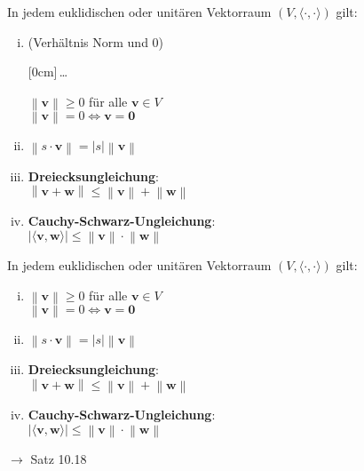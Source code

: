 \documentclass[11pt]{article}
\renewcommand{\cite}[1]{\par\bigskip\hfill{\color{gray}\tiny\(\to\) #1}}
\newcommand*{\abs}[1]{\left\vert#1\right\vert}
\newcommand*{\norm}[1]{\left\|#1\right\|}
\newcommand*{\scprod}[2]{\langle #1, #2\rangle} %
\renewcommand{\leq}{\leqslant}
\renewcommand{\geq}{\geqslant}
\renewcommand{\vec}[1]{\mathbf{#1}}
\newcommand{\hide}[1]{\parbox{0cm}{\raisebox{-7pt}[0cm]{\dots}}\color{white}#1\color{black}}
\newcommand{\hint}[1]{{\color{lightgray}(#1)}}
\let\olddots\dots
\renewcommand{\dots}{\,\olddots\,}
\newenvironment{field}{}{\newpage}
\newif\ifnote
\newenvironment{note}{\notetrue}{\notefalse}
\newcommand{\localtag}{}
\newcommand{\globaltag}{}
\newcommand{\uuid}{}
\newcommand{\tags}[1]{
    \ifnote
        \renewcommand{\localtag}{#1}
    \else
        \renewcommand{\globaltag}{#1}
    \fi
    }
\newcommand{\xplain}[1]{\renewcommand{\uuid}{#1}}
\begin{document}
\begin{note}
    \tags{Satz}
    \xplain{e0e3bcb4-bc10-11ec-8422-0242ac120002}
    \begin{field}
        In jedem euklidischen oder unitären Vektorraum \((V, \scprod{\cdot}{\cdot})\) gilt:
        \begin{enumerate}[(i)]
            \item \hint{Verhältnis Norm und 0}\hide{\(\norm{\vec{v}} \geq 0\) für alle \(\vec{v}\in V\) \\
                  \(\norm{\vec{v}} = 0 \Leftrightarrow \vec{v} = \vec{0}\)}
            \item \(\norm{s\cdot\vec{v}} = \abs{s}\norm{\vec{v}}\)
            \item \textbf{Dreiecksungleichung}:\\
                  \(\norm{\vec{v}+ \vec{w}} \leq \norm{\vec{v}} + \norm{\vec{w}}\)
            \item \textbf{Cauchy-Schwarz-Ungleichung}:\\
                  \(\abs{\scprod{\vec{v}}{\vec{w}}} \leq \norm{\vec{v}}\cdot\norm{\vec{w}}\)
        \end{enumerate}
    \end{field}
    \begin{field}
        In jedem euklidischen oder unitären Vektorraum \((V, \scprod{\cdot}{\cdot})\) gilt:
        \begin{enumerate}[(i)]
            \item \(\norm{\vec{v}} \geq 0\) für alle \(\vec{v}\in V\) \\
                  \(\norm{\vec{v}} = 0 \Leftrightarrow \vec{v} = \vec{0}\)
            \item \(\norm{s\cdot\vec{v}} = \abs{s}\norm{\vec{v}}\)
            \item \textbf{Dreiecksungleichung}:\\
                  \(\norm{\vec{v}+ \vec{w}} \leq \norm{\vec{v}} + \norm{\vec{w}}\)
            \item \textbf{Cauchy-Schwarz-Ungleichung}:\\
                  \(\abs{\scprod{\vec{v}}{\vec{w}}} \leq \norm{\vec{v}}\cdot\norm{\vec{w}}\)
        \end{enumerate}
        \cite{Satz 10.18}
    \end{field}


\end{note}
\end{document}
